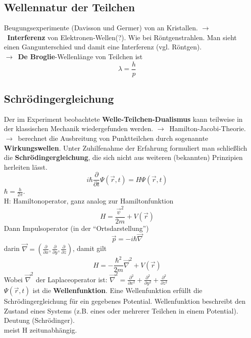 \documentclass[oneside]{book}
\theoremstyle{definition}
\newcommand{\conseq}{$\rightarrow$~}
\newcommand{\circled}[1]{\tikz[baseline=(char.base)]{
		\node[shape=circle,draw,inner sep=2pt] (char) {#1};}}
\newcommand{\fpartial}[1]{\frac{\partial}{\partial #1}}
\newcommand{\ffpartial}[2]{\frac{\partial #1}{\partial #2}}
\newcommand{\celectron}{\circled{$e^-$}}
\begin{document}
\subsection{Wellennatur der Teilchen}
Beugungsexperimente (Davisson und Germer) von \celectron an Kristallen. \conseq \textbf{Interferenz} von Elektronen-Wellen(?). Wie bei Röntgenstrahlen. Man sieht einen Gangunterschied und damit eine Interferenz (vgl. Röntgen).\\
\conseq \textbf{De Broglie}-Wellenlänge von Teilchen ist
$$\lambda = \frac{h}{p}$$

\subsection{Schrödingergleichung}
Der im Experiment beobachtete \textbf{Welle-Teilchen-Dualismus} kann teilweise in der klassischen Mechanik wiedergefunden werden. \conseq Hamilton-Jacobi-Theorie. \conseq berechnet die Ausbreitung von Punktteilchen durch sogenannte \textbf{Wirkungswellen}. Unter Zuhilfenahme der Erfahrung formuliert man schließlich die \textbf{Schrödingergleichung}, die sich nicht aus weiteren (bekannten) Prinzipien herleiten lässt.
$$i \hbar \fpartial{t} \Psi(\vec{r}, t) = H \Psi(\vec{r}, t)$$
$\hbar = \frac{h}{2 \pi}$. \\
H: Hamiltonoperator, ganz analog zur Hamiltonfunktion
$$H = \frac{\vec{v}^2}{2m} + V(\vec{r})$$
Dann Impulsoperator (in der "`Ortsdarstellung"')
$$\vec{p} = - i \hbar \vec{\nabla}$$
darin $\vec{\nabla} = (\fpartial{x}, \fpartial{y}, \fpartial{z})$, damit gilt
$$H = - \frac{\hbar^2}{2m} \vec{\nabla}^2 + V(\vec{r})$$
Wobei $\vec{\nabla}^2$ der Laplaceoperator ist: $\vec{\nabla}^2 = \ffpartial{^2}{x^2} +\ffpartial{^2}{y^2} + \ffpartial{^2}{z^2}$\\
$\Psi(\vec{r}, t)$ ist die \textbf{Wellenfunktion}. Eine Wellenfunktion erfüllt die Schrödingergleichung für ein gegebenes Potential. Wellenfunktion beschreibt den Zustand eines Systems (z.B. eines oder mehrerer Teilchen in einem Potential). Deutung (Schrödinger).\\

meist H zeitunabhängig.
\end{document}
